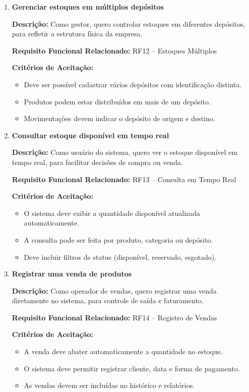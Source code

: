 \documentclass[
	12pt,				%
	openany,			%
	twoside,			%
	a4paper,			%
	english,			%
	brazil				%
	]{abntex2}
\begin{document}
\begin{enumerate}
\item \textbf{Gerenciar estoques em múltiplos depósitos}

\textbf{Descrição:} Como gestor, quero controlar estoques em diferentes depósitos, para refletir a estrutura física da empresa.

\textbf{Requisito Funcional Relacionado:} RF12 -- Estoques Múltiplos

\textbf{Critérios de Aceitação:}
\begin{itemize}
  \item Deve ser possível cadastrar vários depósitos com identificação distinta.
  \item Produtos podem estar distribuídos em mais de um depósito.
  \item Movimentações devem indicar o depósito de origem e destino.
\end{itemize}

\item \textbf{Consultar estoque disponível em tempo real}

\textbf{Descrição:} Como usuário do sistema, quero ver o estoque disponível em tempo real, para facilitar decisões de compra ou venda.

\textbf{Requisito Funcional Relacionado:} RF13 -- Consulta em Tempo Real

\textbf{Critérios de Aceitação:}
\begin{itemize}
  \item O sistema deve exibir a quantidade disponível atualizada automaticamente.
  \item A consulta pode ser feita por produto, categoria ou depósito.
  \item Deve incluir filtros de status (disponível, reservado, esgotado).
\end{itemize}

\item \textbf{Registrar uma venda de produtos}

\textbf{Descrição:} Como operador de vendas, quero registrar uma venda diretamente no sistema, para controle de saída e faturamento.

\textbf{Requisito Funcional Relacionado:} RF14 -- Registro de Vendas

\textbf{Critérios de Aceitação:}
\begin{itemize}
  \item A venda deve abater automaticamente a quantidade no estoque.
  \item O sistema deve permitir registrar cliente, data e forma de pagamento.
  \item As vendas devem ser incluídas no histórico e relatórios.
\end{itemize}


\end{enumerate}
\end{document}
